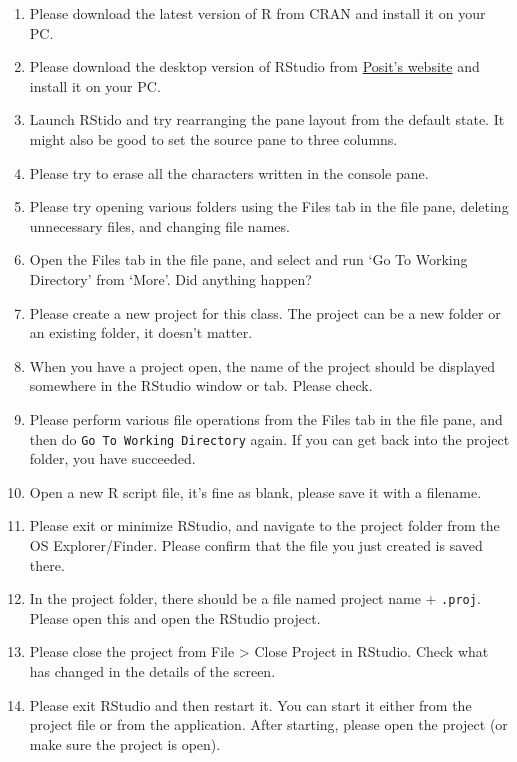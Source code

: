 \documentclass[
  a4paper,
]{book}
\providecommand{\tightlist}{%
  \setlength{\itemsep}{0pt}\setlength{\parskip}{0pt}}\usepackage{longtable,booktabs,array}
\begin{document}
\begin{enumerate}
\def\labelenumi{\arabic{enumi}.}
\tightlist
\item
  Please download the latest version of R from CRAN and install it on
  your PC.
\item
  Please download the desktop version of RStudio from
  \href{https://posit.co/download/rstudio-desktop/}{Posit's website} and
  install it on your PC.
\item
  Launch RStido and try rearranging the pane layout from the default
  state. It might also be good to set the source pane to three columns.
\item
  Please try to erase all the characters written in the console pane.
\item
  Please try opening various folders using the Files tab in the file
  pane, deleting unnecessary files, and changing file names.
\item
  Open the Files tab in the file pane, and select and run `Go To Working
  Directory' from `More'. Did anything happen?
\item
  Please create a new project for this class. The project can be a new
  folder or an existing folder, it doesn't matter.
\item
  When you have a project open, the name of the project should be
  displayed somewhere in the RStudio window or tab. Please check.
\item
  Please perform various file operations from the Files tab in the file
  pane, and then do \texttt{Go\ To\ Working\ Directory} again. If you
  can get back into the project folder, you have succeeded.
\item
  Open a new R script file, it's fine as blank, please save it with a
  filename.
\item
  Please exit or minimize RStudio, and navigate to the project folder
  from the OS Explorer/Finder. Please confirm that the file you just
  created is saved there.
\item
  In the project folder, there should be a file named project name +
  \texttt{.proj}. Please open this and open the RStudio project.
\item
  Please close the project from File \textgreater{} Close Project in
  RStudio. Check what has changed in the details of the screen.
\item
  Please exit RStudio and then restart it. You can start it either from
  the project file or from the application. After starting, please open
  the project (or make sure the project is open).
\end{enumerate}
\end{document}
